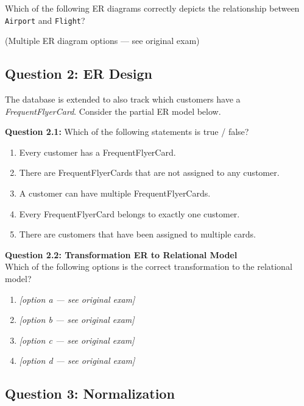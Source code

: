 \documentclass[12pt,a4paper]{article}
\begin{document}
Which of the following ER diagrams correctly depicts the relationship between \texttt{Airport} and \texttt{Flight}?

\vspace{0.5em}
\noindent(Multiple ER diagram options — see original exam)

\vspace{1em}

\subsection*{Question 2: ER Design}

The database is extended to also track which customers have a \textit{FrequentFlyerCard}. Consider the partial ER model below.

\vspace{0.5em}
\noindent\textbf{Question 2.1:} Which of the following statements is true / false?
\begin{enumerate}[label=\alph*)]
  \item Every customer has a FrequentFlyerCard.
  \item There are FrequentFlyerCards that are not assigned to any customer.
  \item A customer can have multiple FrequentFlyerCards.
  \item Every FrequentFlyerCard belongs to exactly one customer.
  \item There are customers that have been assigned to multiple cards.
\end{enumerate}

\vspace{0.5em}
\noindent\textbf{Question 2.2: Transformation ER to Relational Model}\\
Which of the following options is the correct transformation to the relational model?
\begin{enumerate}[label=\alph*)]
  \item \textit{[option a — see original exam]}
  \item \textit{[option b — see original exam]}
  \item \textit{[option c — see original exam]}
  \item \textit{[option d — see original exam]}
\end{enumerate}

\vspace{1em}

\subsection*{Question 3: Normalization}
\end{document}

